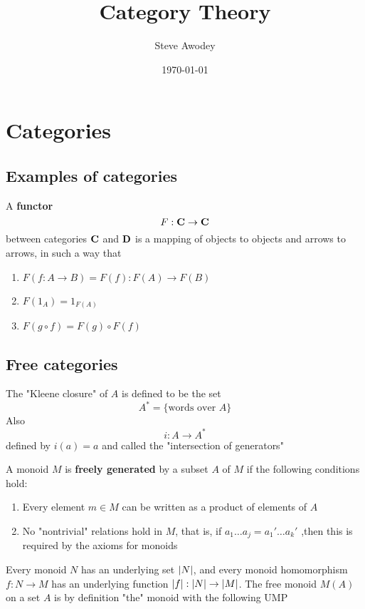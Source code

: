 \documentclass[11pt]{article}
\author{Steve Awodey}
\date{\today}
\title{Category Theory}
\begin{document}
\maketitle
\tableofcontents

\section{Categories}
\label{sec:orgbd94cd0}
\subsection{Examples of categories}
\label{sec:orgefc2503}
\begin{definition}[]
A \textbf{functor}
\begin{equation*}
F:\operatorname{\textbf{C}}\to\operatorname{\textbf{C}}
\end{equation*}
between categories \(\operatorname{\textbf{C}}\) and \(\operatorname{\textbf{D}}\) is a mapping of objects to objects and
arrows to arrows, in such a way that
\begin{enumerate}
\item \(F(f:A\to B)=F(f):F(A)\to F(B)\)
\item \(F(1_A)=1_{F(A)}\)
\item \(F(g\circ f)=F(g)\circ F(f)\)
\end{enumerate}
\end{definition}
\subsection{Free categories}
\label{sec:org1dd03ec}
The "Kleene closure" of \(A\) is defined to be the set
\begin{equation*}
A^*=\{\text{words over $A$}\}
\end{equation*}
Also
\begin{equation*}
i:A\to A^*
\end{equation*}
defined by \(i(a)=a\) and called the "intersection of generators"

A monoid \(M\) is \textbf{freely generated} by a subset \(A\) of \(M\) if the
following conditions hold:
\begin{enumerate}
\item Every element \(m\in M\) can be written as a product of elements of \(A\)
\item No "nontrivial" relations hold in \(M\), that is, if \(a_1\dots
      a_j=a_1'\dots a_k'\) ,then this is required by the axioms for monoids
\end{enumerate}


Every monoid \(N\) has an underlying set \(\abs{N}\), and every monoid
homomorphism \(f:N\to M\) has an underlying function
\(\abs{f}:\abs{N}\to\abs{M}\). The free monoid \(M(A)\) on a set \(A\) is by
definition "the" monoid with the following UMP
\end{document}
